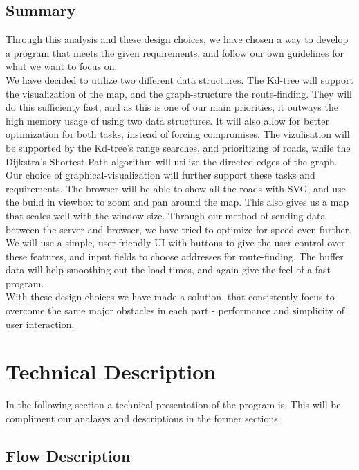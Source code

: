 \documentclass[a4paper,10pt,titlepage]{article}
\begin{document}
		\subsection{Summary}
Through this analysis and these design choices, we have chosen a way to develop a program that meets the given requirements, and follow our own guidelines for what we want to focus on.\\
We have decided to utilize two different data structures. The Kd-tree will support the visualization of the map, and the graph-structure the route-finding. They will do this sufficienty fast, and as this is one of our main priorities, it outways the high memory usage of using two data structures. It will also allow for better optimization for both tasks, instead of forcing compromises. The vizulisation will be supported by the Kd-tree's range searches, and prioritizing of roads, while the Dijkstra's Shortest-Path-algorithm will utilize the directed edges of the graph.\\
Our choice of graphical-visualization will further support these tasks and requirements. The browser will be able to show all the roads with SVG, and use the build in viewbox to zoom and pan around the map. This also gives us a map that scales well with the window size. Through our method of sending data between the server and browser, we have tried to optimize for speed even further.\\
We will use a simple, user friendly UI with buttons to give the user control over these features, and input fields to choose addresses for route-finding. The buffer data will help smoothing out the load times, and again give the feel of a fast program.\\
With these design choices we have made a solution, that consistently focus to overcome the same major obstacles in each part - performance and simplicity of user interaction.
			
	\newpage		
	\section{Technical Description}
		In the following section a technical presentation of the program is. This will be compliment our analasys and descriptions in the former sections.  
		
		\subsection{Flow Description}
\end{document}
